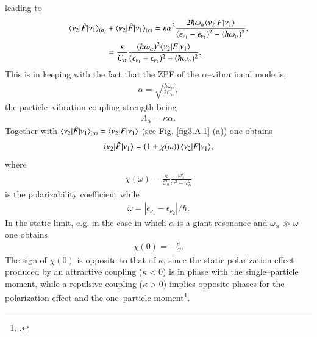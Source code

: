 \begin{subappendices}
leading to 
\begin{align}
\nonumber \langle {\nu_2|\hat F|\nu_1} \rangle_{(b)}&+\langle {\nu_2|\hat F|\nu_1} \rangle_{(c)}=\kappa\alpha^2\frac{2\hbar \omega_\alpha\langle {\nu_2|F|\nu_1} \rangle}{(\epsilon_{\nu_1}-\epsilon_{\nu_2})^2-(\hbar\omega_\alpha)^2},\\
&=\frac{\kappa}{C_\alpha}\frac{(\hbar\omega_\alpha)^2\langle {\nu_2|F|\nu_1} \rangle}{(\epsilon_{\nu_1}-\epsilon_{\nu_2})^2-(\hbar\omega_\alpha)^2}.
\end{align}
This is in keeping with the fact that the ZPF of the $\alpha$--vibrational mode is,
\begin{align}
\alpha=\sqrt{\frac{\hbar\omega_\alpha}{2C_\alpha}},
\end{align}
the particle--vibration coupling strength being
\begin{align}
\Lambda_\alpha=\kappa\alpha.
\end{align}
Together with $\langle {\nu_2|\hat F|\nu_1} \rangle_{(a)}=\langle {\nu_2|F|\nu_1} \rangle$ (see Fig. \ref{fig3.A.1} (a)) one obtains
\begin{align}\label{eq3.A.12}
\langle {\nu_2|\hat F|\nu_1} \rangle=\left(1+\chi(\omega)\right)\langle {\nu_2|F|\nu_1} \rangle,
\end{align}
where
\begin{align}\label{eq3.A.13}
 \chi(\omega)=\frac{\kappa}{C_\alpha}\frac{\omega_\alpha^2}{\omega^2-\omega_\alpha^2}
\end{align}
is the polarizability coefficient while
\begin{align}\label{eq3.A.14}
\omega=|\epsilon_{\nu_1}-\epsilon_{\nu_2}|/\hbar.
\end{align}
In the static limit, e.g. in the case in which $\alpha$ is a giant resonance and $\omega_\alpha\gg\omega$ one obtains
\begin{align}\label{eq3.A.15}
\chi(0)=-\frac{\kappa}{C}.
\end{align}
The sign of $\chi(0)$ is opposite to that of $\kappa$, since the static polarization effect produced by an attractive coupling ($\kappa<0$) is in phase with the single--particle moment, while a repulsive coupling ($\kappa>0$) implies opposite phases for the polarization effect and the one--particle moment\footnote{\cite{Bohr:75,Mottelson:62}.}.




\end{subappendices}

